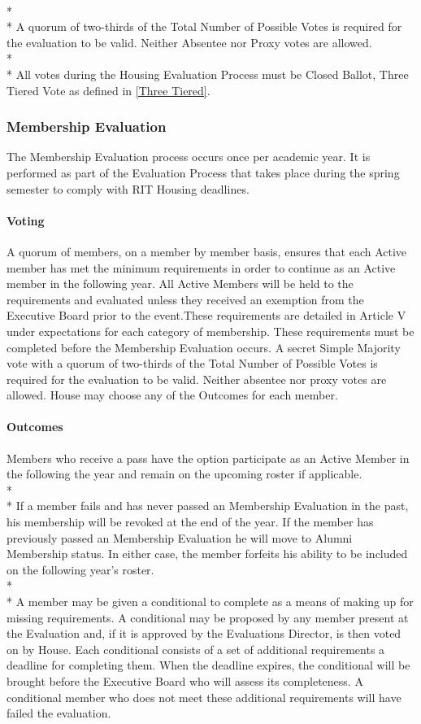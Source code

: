 \documentclass{article}
\newcommand{\bsubsection}[1]{\subsubsection{#1} \label{#1}}
\newcommand{\bsubsubsection}[1]{\paragraph{#1} \label{#1}}
\begin{document}
\\* \\*
A quorum of two-thirds of the Total Number of Possible Votes is required for the evaluation to be valid. Neither Absentee nor Proxy votes are allowed.
\\* \\*
All votes during the Housing Evaluation Process must be Closed Ballot, Three Tiered Vote as defined in \ref{Three Tiered}.
\bsubsection{Membership Evaluation}
The Membership Evaluation process occurs once per academic year. It is performed as part of the Evaluation Process that takes place during the spring semester to comply with RIT Housing deadlines.
\bsubsubsection{Voting} 
A quorum of members, on a member by member basis, ensures that each Active member has met the minimum requirements in order to continue as an Active member in the following year. All Active Members will be held to the requirements and evaluated unless they received an exemption from the Executive Board prior to the event.These requirements are detailed in Article V under expectations for each category of membership. These requirements must be completed before the Membership Evaluation occurs. A secret Simple Majority vote with a quorum of two-thirds of the Total Number of Possible Votes is required for the evaluation to be valid. Neither absentee nor proxy votes are allowed. House may choose any of the Outcomes for each member.
\bsubsubsection{Outcomes}
Members who receive a pass have the option participate as an Active Member in the following the year and remain on the upcoming roster if applicable.
\\* \\*
If a member fails and has never passed an Membership Evaluation in the past, his membership will be revoked at the end of the year. If the member has previously passed an Membership Evaluation he will move to Alumni Membership status. In either case, the member forfeits his ability to be included on the following year’s roster.
\\* \\*
A member may be given a conditional to complete as a means of making up for missing requirements. A conditional may be proposed by any member present at the Evaluation and, if it is approved by the Evaluations Director, is then voted on by House. Each conditional consists of a set of additional requirements a deadline for completing them. When the deadline expires, the conditional will be brought before the Executive Board who will assess its completeness. A conditional member who does not meet these additional requirements will have failed the evaluation.
\end{document}
